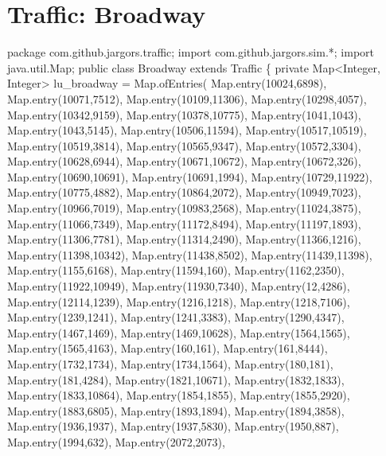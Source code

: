\nwenddocs{}\nwenddocs{}\chapter{Traffic: Broadway}

\nwenddocs{}\endmoddef\nwstartdeflinemarkup\nwenddeflinemarkup
package com.github.jargors.traffic;
import com.github.jargors.sim.*;
import java.util.Map;
public class Broadway extends Traffic \{
  private Map<Integer, Integer> lu_broadway = Map.ofEntries(
    Map.entry(10024,6898),
    Map.entry(10071,7512),
    Map.entry(10109,11306),
    Map.entry(10298,4057),
    Map.entry(10342,9159),
    Map.entry(10378,10775),
    Map.entry(1041,1043),
    Map.entry(1043,5145),
    Map.entry(10506,11594),
    Map.entry(10517,10519),
    Map.entry(10519,3814),
    Map.entry(10565,9347),
    Map.entry(10572,3304),
    Map.entry(10628,6944),
    Map.entry(10671,10672),
    Map.entry(10672,326),
    Map.entry(10690,10691),
    Map.entry(10691,1994),
    Map.entry(10729,11922),
    Map.entry(10775,4882),
    Map.entry(10864,2072),
    Map.entry(10949,7023),
    Map.entry(10966,7019),
    Map.entry(10983,2568),
    Map.entry(11024,3875),
    Map.entry(11066,7349),
    Map.entry(11172,8494),
    Map.entry(11197,1893),
    Map.entry(11306,7781),
    Map.entry(11314,2490),
    Map.entry(11366,1216),
    Map.entry(11398,10342),
    Map.entry(11438,8502),
    Map.entry(11439,11398),
    Map.entry(1155,6168),
    Map.entry(11594,160),
    Map.entry(1162,2350),
    Map.entry(11922,10949),
    Map.entry(11930,7340),
    Map.entry(12,4286),
    Map.entry(12114,1239),
    Map.entry(1216,1218),
    Map.entry(1218,7106),
    Map.entry(1239,1241),
    Map.entry(1241,3383),
    Map.entry(1290,4347),
    Map.entry(1467,1469),
    Map.entry(1469,10628),
    Map.entry(1564,1565),
    Map.entry(1565,4163),
    Map.entry(160,161),
    Map.entry(161,8444),
    Map.entry(1732,1734),
    Map.entry(1734,1564),
    Map.entry(180,181),
    Map.entry(181,4284),
    Map.entry(1821,10671),
    Map.entry(1832,1833),
    Map.entry(1833,10864),
    Map.entry(1854,1855),
    Map.entry(1855,2920),
    Map.entry(1883,6805),
    Map.entry(1893,1894),
    Map.entry(1894,3858),
    Map.entry(1936,1937),
    Map.entry(1937,5830),
    Map.entry(1950,887),
    Map.entry(1994,632),
    Map.entry(2072,2073),
